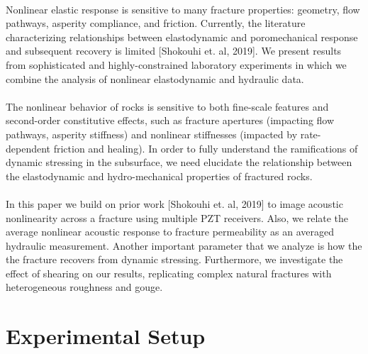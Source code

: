 \documentclass[letterpaper,10pt]{article}
\begin{document}
\paragraph{} Nonlinear elastic response is sensitive to many fracture properties: geometry, flow pathways, asperity compliance, and friction. Currently, the literature characterizing relationships between elastodynamic and poromechanical response and subsequent recovery is limited [Shokouhi et. al, 2019]. We present results from sophisticated and highly-constrained  laboratory experiments in which we combine the analysis of nonlinear elastodynamic and hydraulic data.

\paragraph{} The nonlinear behavior of rocks is sensitive to both fine-scale features and second-order constitutive effects, such as fracture apertures (impacting flow pathways, asperity stiffness) and nonlinear stiffnesses (impacted by rate-dependent friction and healing). In order to fully understand the ramifications of dynamic stressing in the subsurface, we need elucidate the relationship between the elastodynamic and hydro-mechanical properties of fractured rocks.

\paragraph{}
In this paper we build on prior work [Shokouhi et. al, 2019] to image acoustic nonlinearity across a fracture using multiple PZT receivers. Also, we relate the average nonlinear acoustic response to fracture permeability as an averaged hydraulic measurement. Another important parameter that we analyze is how the the fracture recovers from dynamic stressing. Furthermore, we investigate the effect of shearing on our results, replicating complex natural fractures with heterogeneous roughness and gouge.     



\section{Experimental Setup}
\label{sec:experimnt_setup}
\end{document}
